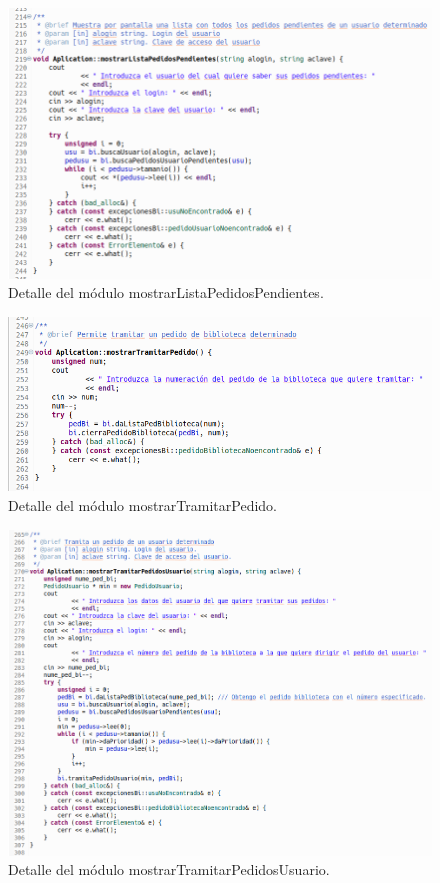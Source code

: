  			\begin{figure}[H]
 				\centering
 				\includegraphics[scale=0.5]{img/captura102.png}
 				\caption{Detalle del módulo mostrarListaPedidosPendientes.}
 				\label{captura102}
 			\end{figure}
 		
 			\begin{figure}[H]
 				\centering
 				\includegraphics[scale=0.5]{img/captura103.png}
 				\caption{Detalle del módulo mostrarTramitarPedido.}
 				\label{captura103}
 			\end{figure}
 		
 			\begin{figure}[H]
 				\centering
 				\includegraphics[scale=0.5]{img/captura104.png}
 				\caption{Detalle del módulo mostrarTramitarPedidosUsuario.}
 				\label{captura104}
 			\end{figure}
			
